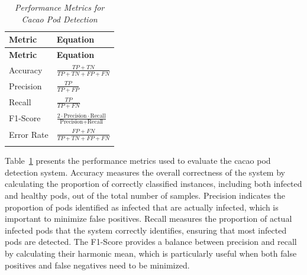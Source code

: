 \begin{longtable}{p{4cm} >{\centering\arraybackslash}p{7cm}}
	\caption{\textit{Performance Metrics for Cacao Pod Detection}} \label{tab:metrics}                    \\

	\toprule
	\textbf{Metric} & \textbf{Equation}                                                                   \\
	\midrule
	\endfirsthead

	\toprule
	\textbf{Metric} & \textbf{Equation}                                                                   \\
	\midrule
	\endhead

	\bottomrule
	\endfoot

	Accuracy        &
	$\displaystyle \frac{TP + TN}{TP + TN + FP + FN}$                                                     \\ \addlinespace \addlinespace

	Precision       &
	$\displaystyle \frac{TP}{TP + FP}$                                                                    \\ \addlinespace \addlinespace

	Recall          &
	$\displaystyle \frac{TP}{TP + FN}$                                                                    \\ \addlinespace \addlinespace

	F1-Score        &
	$\displaystyle \frac{2 \cdot \text{Precision} \cdot \text{Recall}}{\text{Precision} + \text{Recall}}$ \\ \addlinespace \addlinespace

	Error Rate      &
	$\displaystyle \frac{FP + FN}{TP + TN + FP + FN}$                                                     \\ \addlinespace \addlinespace
\end{longtable}

Table~\ref{tab:metrics} presents the performance metrics used to evaluate the cacao pod detection system. Accuracy measures the overall correctness of the system by calculating the proportion of correctly classified instances, including both infected and healthy pods, out of the total number of samples. Precision indicates the proportion of pods identified as infected that are actually infected, which is important to minimize false positives. Recall measures the proportion of actual infected pods that the system correctly identifies, ensuring that most infected pods are detected. The F1-Score provides a balance between precision and recall by calculating their harmonic mean, which is particularly useful when both false positives and false negatives need to be minimized. 
